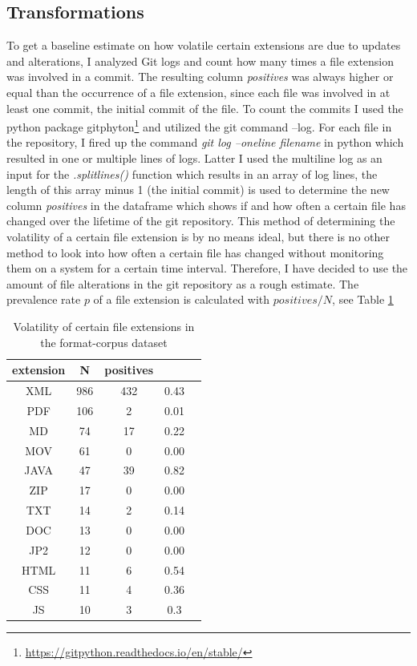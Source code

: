 \subsection{Transformations}
To get a baseline estimate on how volatile certain extensions are due to updates and alterations, I analyzed Git logs and count how many times a file extension was involved in a commit. The resulting column \textit{positives} was always higher or equal than the occurrence of a file extension, since each file was involved in at least one commit, the initial commit of the file. To count the commits I used the python package gitphyton\footnote{\url{https://gitpython.readthedocs.io/en/stable/}} and utilized the git command --log. For each file in the repository, I fired up the command \textit{git log --oneline filename} in python which resulted in one or multiple lines of logs. Latter I used the multiline log as an input for the \textit{.splitlines()} function which results in an array of log lines, the length of this array minus 1 (the initial commit) is used to determine the new column \textit{positives} in the dataframe which shows if and how often a certain file has changed over the lifetime of the git repository. 
This method of determining the volatility of a certain file extension is by no means ideal, but there is no other method to look into how often a certain file has changed without monitoring them on a system for a certain time interval. Therefore, I have decided to use the amount of file alterations in the git repository as a rough estimate.
The prevalence rate $p$ of a file extension is calculated with $positives/N$, see Table \ref{tb:git-alterations}
\begin{table}[h]
    \caption{Volatility of certain file extensions in the format-corpus dataset}
    \centering
    \begin{tabular}{ c c c c c}
    \label{tb:git-alterations}
     extension & N & positives\\ 
     \hline
     XML & 986 & 432 & 0.43  \\
     \hline
     PDF &106 &2 &0.01  \\
     \hline
     MD & 74 & 17 & 0.22  \\   
     \hline
     MOV&61 & 0 & 0.00 \\ 
     \hline
     JAVA &47 &39&0.82 \\ 
     \hline
     ZIP & 17 &0 &0.00 \\
     \hline
     TXT & 14 & 2 & 0.14 \\
     \hline
     DOC & 13 & 0 & 0.00 \\ 
     \hline
     JP2 & 12 & 0 & 0.00 \\  
     \hline
     HTML & 11 & 6 & 0.54 \\ 
     \hline
     CSS & 11 & 4 & 0.36 \\
     \hline
     JS & 10 & 3 & 0.3 \\
    \end{tabular}
\end{table}


